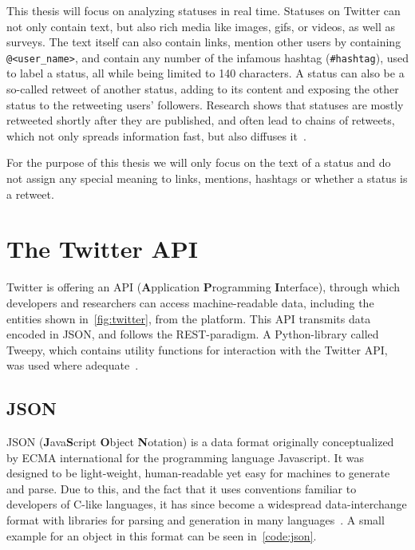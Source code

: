 \par
This thesis will focus on analyzing statuses in real time.
Statuses on Twitter can not only contain text, but also rich media like images, gifs, or videos, as well as surveys.
The text itself can also contain links, mention other users by containing \texttt{@<user\_name>},
and contain any number of the infamous hashtag (\texttt{\#hashtag}), used to label a status, all while being limited to 140 characters.
A status can also be a so-called retweet of another status, adding to its content and exposing the other status to the retweeting users' followers.
Research shows that statuses are mostly retweeted shortly after they are published, and often lead to chains of retweets,
which not only spreads information fast, but also diffuses it~\cite{Kwak2010}.\\
\par
For the purpose of this thesis we will only focus on the text of a status and do not assign any special meaning to links,
mentions, hashtags or whether a status is a retweet.\\

\section{The Twitter API}
\label{sec:theApi}

Twitter is offering an API (\textbf{A}pplication \textbf{P}rogramming \textbf{I}nterface),
through which developers and researchers can access machine-readable data,
including the entities shown in~\autoref{fig:twitter}, from the platform.
This API transmits data encoded in JSON, and follows the REST-paradigm.
A Python-library called Tweepy, which contains utility functions for interaction with the Twitter API, was used where adequate~\cite{tweepyDocs}.

\subsection{JSON}
\label{subsec:json}

JSON (\textbf{J}ava\textbf{S}cript \textbf{O}bject \textbf{N}otation) is a data format originally conceptualized by ECMA international
for the programming language Javascript.
It was designed to be light-weight, human-readable yet easy for machines to generate and parse.
Due to this, and the fact that it uses conventions familiar to developers of C-like languages,
it has since become a widespread data-interchange format with libraries for parsing and generation in many languages~\cite{jsonDocs}.
A small example for an object in this format can be seen in~\autoref{code:json}.


